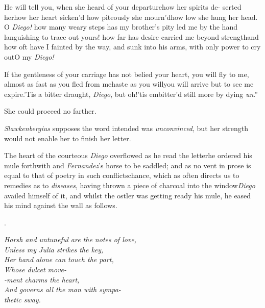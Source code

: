 \documentclass{article}
\begin{document}
\indent\lqq He will tell you, when she heard\break
\lqq of your departure\tsk how her spirits de-\break
\lqq serted her\tsk how her heart sicken’d\tsk\break
\lqq how piteously she mourn’d\tsh how low\break
\lqq she hung her head. O \textit{Diego!} how\break
\lqq many weary steps has my brother’s\break
\lqq pity led me by the hand languishing\break
\lqq to trace out yours! how far has desire\break
\lqq carried me beyond strength\tsh and how
\lqq oft have I fainted by the way, and\break
\lqq sunk into his arms, with only power\break
\lqq to cry out\tsk O my \textit{Diego!}

\indent\lqq If the gentleness of your carriage\break
\lqq has not belied your heart, you will fly\break
\lqq to me, almost as fast as you fled from\break
\lqq me\tsk haste as you will\tsh you will arrive\break
\lqq but to see me expire.\tsk ’Tis a bitter\break
\lqq draught, \textit{Diego}, but oh!\@ ’tis embitter’d\break
\lqq still more by dying \textit{un}\tsh.”

She could proceed no farther.

\textit{Slawkenbergius} supposes the word intended was
\textit{unconvinced}, but her strength would not enable her to finish her
letter.

The heart of the courteous \textit{Diego} overflowed as he read
the letter\tsk he ordered his mule forthwith and
\textit{Fernandez}’s horse
to be saddled; and as no vent in
prose is equal to that of poetry in such
conflicts\tsk chance, which as often directs us to
remedies as to \textit{diseases}, having thrown a piece of charcoal
into the window\tsh \textit{Diego} availed himself of it,
and whilst the ostler was getting ready his mule, he eased his
mind against the wall as follows.

\bigskip
\centerline{.}
\parskip
\bgroup\itshape\small\noindent
\null\quad Harsh and untuneful are the notes of love,\\
\null\qquad Unless my Julia strikes the key,\\
\null\quad Her hand alone can touch the part,\\
\null\qquad Whose dulcet move-\\
\null\quad -ment charms the heart,\\
\null\qquad And governs all the man with sympa-\\
\null\qquad\quad thetic sway.
\par\egroup
\end{document}
